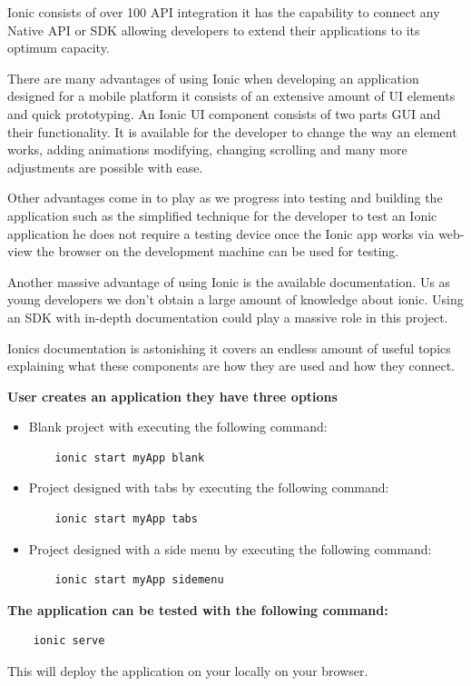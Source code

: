 \documentclass[a4paper,12pt]{report}
\begin{document}
Ionic consists of over 100 API integration it has the capability to connect any Native API or SDK allowing developers to extend their applications to its optimum capacity.\cite{ionicInsight}

There are many advantages of using Ionic when developing an application designed for a mobile platform it consists of an extensive amount of UI elements and quick prototyping. An Ionic UI component consists of two parts GUI and their functionality. It is available for the developer to change the way an element works, adding animations modifying, changing scrolling and many more adjustments are possible with ease.

Other advantages come in to play as we progress into testing and building the application such as the simplified technique for the developer to test an Ionic application he does not require a testing device once the Ionic app works via web-view the browser on the development machine can be used for testing.

Another massive advantage of using Ionic is the available documentation. Us as young developers we don't obtain a large amount of knowledge about ionic. Using an SDK with in-depth documentation could play a massive role in this project.

Ionics documentation is astonishing it covers an endless amount of useful topics explaining what these components are how they are used and how they connect.\cite{ionicPros}

\textbf{User creates an application they have three options} 
\begin{itemize}
    \item Blank project with executing the following command: 
\begin{verbatim}
    ionic start myApp blank
\end{verbatim}
    \item Project designed with tabs by executing the following command:
\begin{verbatim}
    ionic start myApp tabs
\end{verbatim}
    \item Project designed with a side menu by executing the following command:
\begin{verbatim}
    ionic start myApp sidemenu
\end{verbatim}
\end{itemize}

\textbf{The application can be tested with the following command:}
\begin{verbatim}
    ionic serve
\end{verbatim}
This will deploy the application on your locally on your browser.\cite{ionicRun}
\end{document}
